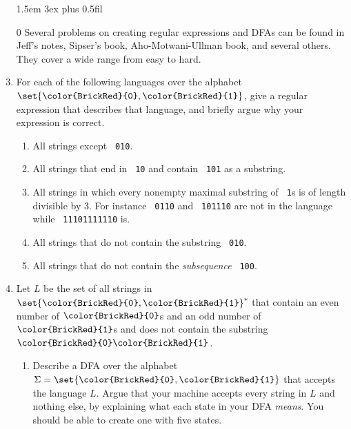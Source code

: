 \documentclass[11pt]{article}
\def\Sym#1{\texttt{\upshape \color{BrickRed} {#1}}}
\begin{document}
\begin{enumerate}
\parindent 1.5em \itemsep 3ex plus 0.5fil


\item[0] Several problems on creating regular expressions
  and DFAs can be found in Jeff's notes, Sipser's book, Aho-Motwani-Ullman book,
  and several others. They cover a wide range from easy to hard.



\item
For each of the following languages over the alphabet $\set{\Sym0,\Sym1}$, give a regular expression that describes that language, and briefly argue why your expression is correct.

\begin{enumerate}
\item All strings except \Sym{010}.
\item All strings that end in \Sym{10} and contain \Sym{101}
as a substring.
\item All strings in which every nonempty maximal substring of \Sym{1}s
  is of length divisible by 3. For instance \Sym{0110} and
  \Sym{101110} are not in the
  language while \Sym{11101111110} is.
\item All strings that do not contain the substring \Sym{010}.
\item All strings that do not contain the {\em subsequence} \Sym{100}.
\end{enumerate}






\item
Let $L$ be the set of all strings in $\set{\Sym0,\Sym1}^*$ that
contain an even number of $\Sym0$s and an odd number of $\Sym1$s
and does not contain the substring $\Sym0\Sym1$.

\begin{enumerate}\parindent 1.5em
\item  Describe a DFA over the alphabet $\Sigma = \set{\Sym0,\Sym1}$
  that accepts the language $L$.  Argue that your machine accepts
  every string in $L$ and nothing else, by explaining what each state
  in your DFA \emph{means}.
  You should be able to create one with five states.


\end{enumerate}
\end{enumerate}
\end{document}
